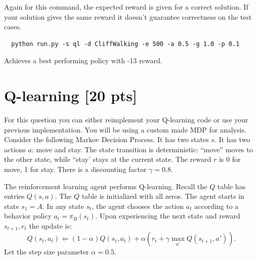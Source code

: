 \documentclass[a4paper]{article}
\theoremstyle{definition}
\begin{document}
Again for this command, the expected reward is given for a correct solution. If your solution gives the same reward it doesn't guarantee correctness on the test cases.

\begin{verbatim}
  python run.py -s ql -d CliffWalking -e 500 -a 0.5 -g 1.0 -p 0.1  
\end{verbatim}

Achieves a best performing policy with -13 reward.

\section{Q-learning [20 pts]}
For this question you can either reimplement your Q-learning code or use your previous implementation. You will be using a custom made MDP for analysis. Consider the following Markov Decision Process.
It has two states $s$. It has two actions $a$: move and stay. The state transition is deterministic: ``move'' moves to the other state, while ``stay' stays at the current state. The reward $r$ is 0 for move,  1 for stay. There is a discounting factor $\gamma=0.8$.
\\


The reinforcement learning agent performs Q-learning.  Recall the $Q$ table has entries $Q(s,a)$. The $Q$ table is initialized with all zeros. The agent starts in state $s_1=A$. In any state $s_t$, the agent chooses the action $a_t$ according to a behavior policy $a_t = \pi_B(s_t)$. Upon experiencing the next state and reward $s_{t+1}, r_t$ the update is:
$$Q(s_t, a_t) \Leftarrow (1-\alpha) Q(s_t, a_t) + \alpha \left( r_t + \gamma \max_{a'} Q(s_{t+1}, a') \right).$$
Let the step size parameter $\alpha=0.5$.
\end{document}
